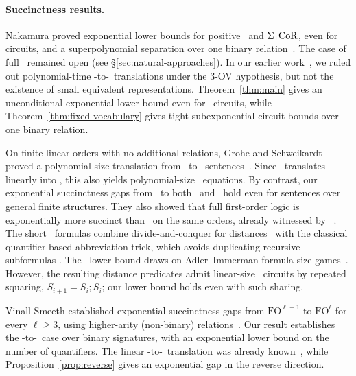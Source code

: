 \paragraph{Succinctness results.}
Nakamura proved exponential lower bounds for positive \CoR\ and
$\Sigma_1\mathrm{CoR}$, even for circuits, and a superpolynomial separation over
one binary relation~\citep[\S6]{nakamura2022}. The case of full \CoR\
remained open (see \S\ref{sec:natural-approaches}). In our earlier
work~\citep[Corollary~40]{nakamura-uezato2027}, we ruled out
polynomial-time \FOthree-to-\CoR\ translations under the 3-OV
hypothesis, but not the existence of small equivalent representations.
Theorem~\ref{thm:main} gives an unconditional exponential lower bound
even for \CoR\ circuits, while Theorem~\ref{thm:fixed-vocabulary}
gives tight subexponential circuit bounds over one binary relation.

On finite linear orders with no additional relations, Grohe and Schweikardt proved a polynomial-size translation from \FOthree\ to \FOtwo\ sentences~\citep[Theorem~4.3]{grohe-schweikardt2005}. Since \FOtwo\ translates linearly into \CoR, this also yields polynomial-size \CoR\ equations. By contrast, our exponential succinctness gaps from \FOthree\ to both \FOtwo\ and \CoR\ hold even for sentences over general finite structures.
%
They also showed that full first-order logic is exponentially more
succinct than \FOthree\ on the same orders, already witnessed by
\FOfour~\citep[Theorem~5.3]{grohe-schweikardt2005}. The short \FOfour\
formulas combine divide-and-conquer for distances~\citep{savitch1970}
with the classical quantifier-based abbreviation trick, which avoids
duplicating recursive subformulas
\citep{fischer-rabin1974,stockmeyer1974,ferrante-rackoff1979,compton-henson1990,vorobyov1996,stockmeyer-meyer2002}.
The \FOthree\ lower bound draws on Adler--Immerman formula-size
games~\citep{adler-immerman2003}. However, the resulting distance
predicates admit linear-size \CoR\ circuits by repeated squaring,
$S_{i+1}=S_i;S_i$; our lower bound holds even with such sharing.

Vinall-Smeeth established exponential succinctness gaps from
$\mathrm{FO}^{\ell+1}$ to $\mathrm{FO}^{\ell}$ for every $\ell\ge 3$,
using higher-arity (non-binary) relations~\citep[Theorem~2]{vinall-smeeth2024}.
Our result establishes the \FOthree-to-\FOtwo\ case over binary
signatures, with an exponential lower bound on the number of
quantifiers. The linear \FOtwo-to-\CoR\ translation was already
known~\citep{nakamura2022}, while Proposition~\ref{prop:reverse}
gives an exponential gap in the reverse direction.

